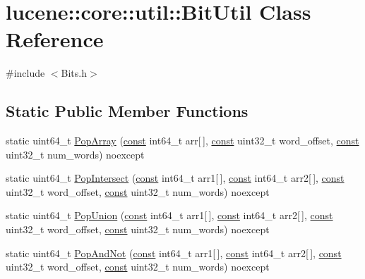 \hypertarget{classlucene_1_1core_1_1util_1_1BitUtil}{}\section{lucene\+:\+:core\+:\+:util\+:\+:Bit\+Util Class Reference}
\label{classlucene_1_1core_1_1util_1_1BitUtil}


{\ttfamily \#include $<$Bits.\+h$>$}

\subsection*{Static Public Member Functions}
\begin{DoxyCompactItemize}
\item 
static uint64\+\_\+t \mbox{\hyperlink{classlucene_1_1core_1_1util_1_1BitUtil_a88df8d9e6ec36893009b4fb1c5359e28}{Pop\+Array}} (\mbox{\hyperlink{ZlibCrc32_8h_a2c212835823e3c54a8ab6d95c652660e}{const}} int64\+\_\+t arr\mbox{[}$\,$\mbox{]}, \mbox{\hyperlink{ZlibCrc32_8h_a2c212835823e3c54a8ab6d95c652660e}{const}} uint32\+\_\+t word\+\_\+offset, \mbox{\hyperlink{ZlibCrc32_8h_a2c212835823e3c54a8ab6d95c652660e}{const}} uint32\+\_\+t num\+\_\+words) noexcept
\item 
static uint64\+\_\+t \mbox{\hyperlink{classlucene_1_1core_1_1util_1_1BitUtil_aa35baf5dac5a6731661e08da849410f4}{Pop\+Intersect}} (\mbox{\hyperlink{ZlibCrc32_8h_a2c212835823e3c54a8ab6d95c652660e}{const}} int64\+\_\+t arr1\mbox{[}$\,$\mbox{]}, \mbox{\hyperlink{ZlibCrc32_8h_a2c212835823e3c54a8ab6d95c652660e}{const}} int64\+\_\+t arr2\mbox{[}$\,$\mbox{]}, \mbox{\hyperlink{ZlibCrc32_8h_a2c212835823e3c54a8ab6d95c652660e}{const}} uint32\+\_\+t word\+\_\+offset, \mbox{\hyperlink{ZlibCrc32_8h_a2c212835823e3c54a8ab6d95c652660e}{const}} uint32\+\_\+t num\+\_\+words) noexcept
\item 
static uint64\+\_\+t \mbox{\hyperlink{classlucene_1_1core_1_1util_1_1BitUtil_ac52c26353a131f7cb71b4e6dd68e7059}{Pop\+Union}} (\mbox{\hyperlink{ZlibCrc32_8h_a2c212835823e3c54a8ab6d95c652660e}{const}} int64\+\_\+t arr1\mbox{[}$\,$\mbox{]}, \mbox{\hyperlink{ZlibCrc32_8h_a2c212835823e3c54a8ab6d95c652660e}{const}} int64\+\_\+t arr2\mbox{[}$\,$\mbox{]}, \mbox{\hyperlink{ZlibCrc32_8h_a2c212835823e3c54a8ab6d95c652660e}{const}} uint32\+\_\+t word\+\_\+offset, \mbox{\hyperlink{ZlibCrc32_8h_a2c212835823e3c54a8ab6d95c652660e}{const}} uint32\+\_\+t num\+\_\+words) noexcept
\item 
static uint64\+\_\+t \mbox{\hyperlink{classlucene_1_1core_1_1util_1_1BitUtil_ac247f117af6266225cfe030b62eb3a87}{Pop\+And\+Not}} (\mbox{\hyperlink{ZlibCrc32_8h_a2c212835823e3c54a8ab6d95c652660e}{const}} int64\+\_\+t arr1\mbox{[}$\,$\mbox{]}, \mbox{\hyperlink{ZlibCrc32_8h_a2c212835823e3c54a8ab6d95c652660e}{const}} int64\+\_\+t arr2\mbox{[}$\,$\mbox{]}, \mbox{\hyperlink{ZlibCrc32_8h_a2c212835823e3c54a8ab6d95c652660e}{const}} uint32\+\_\+t word\+\_\+offset, \mbox{\hyperlink{ZlibCrc32_8h_a2c212835823e3c54a8ab6d95c652660e}{const}} uint32\+\_\+t num\+\_\+words) noexcept

\end{DoxyCompactItemize}
